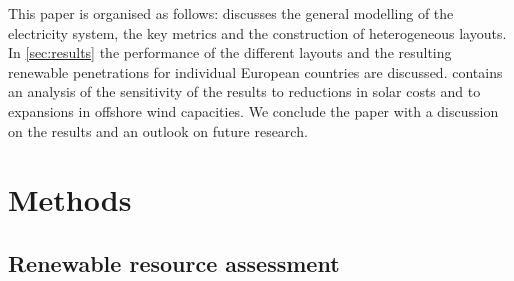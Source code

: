 \documentclass[a4paper, 5p, sort&compress]{elsarticle}%
\begin{document}



This paper is organised as follows:  discusses the
general modelling of the electricity system, the key metrics and the
construction of heterogeneous layouts. In \cref{sec:results} the
performance of the different layouts and the resulting renewable
penetrations for individual European countries are
discussed.  contains an analysis of the
sensitivity of the results to reductions in solar costs and to
expansions in offshore wind capacities. We conclude the paper with a
discussion on the results and an outlook on future research.

\section{Methods}
\label{sec:two}


\subsection{Renewable resource assessment}
\end{document}
